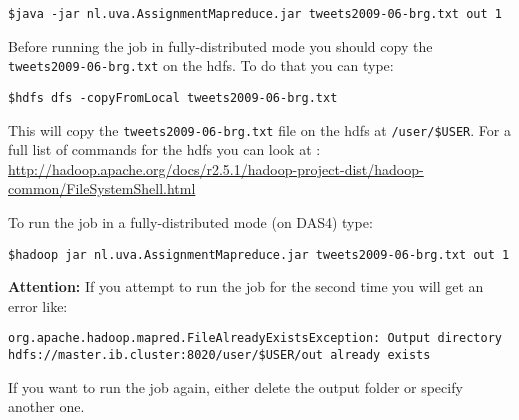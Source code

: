 \documentclass[a4paper,10pt]{article}
\begin{document}
\begin{lstlisting}
$java -jar nl.uva.AssignmentMapreduce.jar tweets2009-06-brg.txt out 1 
\end{lstlisting}

Before running the job in fully-distributed mode you should copy the \texttt{tweets2009-06-brg.txt} on the hdfs. To do that you can type:

\begin{lstlisting}
$hdfs dfs -copyFromLocal tweets2009-06-brg.txt
\end{lstlisting}

This will copy the \texttt{tweets2009-06-brg.txt} file on the hdfs at \texttt{/user/\$USER}. For a full list of commands for the hdfs you can look at : \url{http://hadoop.apache.org/docs/r2.5.1/hadoop-project-dist/hadoop-common/FileSystemShell.html}

To run the job in a fully-distributed mode (on DAS4) type: 
\begin{lstlisting}
$hadoop jar nl.uva.AssignmentMapreduce.jar tweets2009-06-brg.txt out 1
\end{lstlisting}

\textbf{Attention:} If you attempt to run the job for the second time you will get an error like:
\begin{lstlisting}
org.apache.hadoop.mapred.FileAlreadyExistsException: Output directory hdfs://master.ib.cluster:8020/user/$USER/out already exists
\end{lstlisting}

If you want to run the job again, either delete the output folder or specify another one. 
\end{document}
